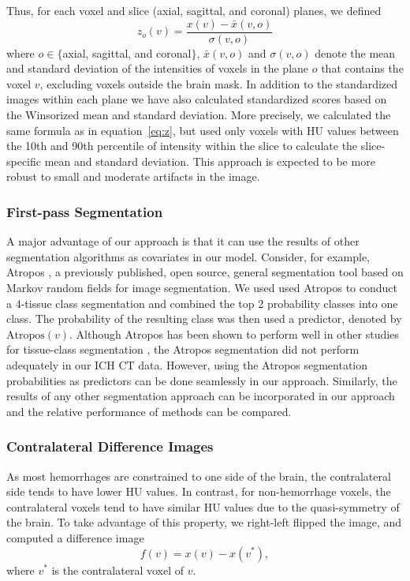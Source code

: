 \documentclass{elsarticle_nonatbib}\usepackage[]{graphicx}\usepackage[]{color}
\begin{document}
Thus, for each voxel and slice (axial, sagittal, and coronal) planes, we defined 
\begin{equation}
z_{o}(v) = \frac{x(v) - \bar{x}(v, o)}{\sigma(v, o)} \label{eq:z}
\end{equation}
where $o \in \{$axial, sagittal, and coronal$\}$, $\bar{x}(v, o)$ and $\sigma(v, o)$ denote the mean and standard deviation of the intensities of voxels in the plane $o$ that contains the voxel $v$, excluding voxels outside the brain mask.   In addition to the standardized images within each plane we have also calculated standardized scores based on the Winsorized mean and standard deviation.  More precisely, we calculated the same formula as in equation~\eqref{eq:z}, but used only voxels with HU values between the 10th and 90th percentile of intensity within the slice to calculate the slice-specific mean and standard deviation. This approach is expected to be more robust to small and moderate artifacts in the image.

\subsubsection{First-pass Segmentation} A major advantage of our approach is that it can use the results of other segmentation algorithms as covariates in our model. Consider, for example, Atropos \citep{atropos}, a previously published, open source, general segmentation tool based on Markov random fields for image segmentation.  We used used Atropos to conduct a 4-tissue class segmentation and combined the top 2 probability classes into one class.  The probability of the resulting class was then used a predictor, denoted by $\text{Atropos}(v)$.  Although Atropos has been shown to perform well in other studies for tissue-class segmentation \citep{atropos, menze2015multimodal}, the Atropos segmentation did not perform adequately in our ICH CT data. However, using the Atropos segmentation probabilities as predictors can be done seamlessly in our approach. Similarly, the results of any other segmentation approach can be incorporated in our approach and the relative performance of methods can be compared.

\subsubsection{Contralateral Difference Images}  As most hemorrhages are constrained to one side of the brain, the contralateral side tends to have lower HU values.  In contrast, for non-hemorrhage voxels, the contralateral voxels tend to have similar HU values due to the quasi-symmetry of the brain. To take advantage of this property, we right-left flipped the image, and computed a difference image 
\begin{equation}
f(v) = x(v) - x(v^{*}), \label{eq:flip}
\end{equation}
where $v^{*}$ is the contralateral voxel of $v$.  
\end{document}
